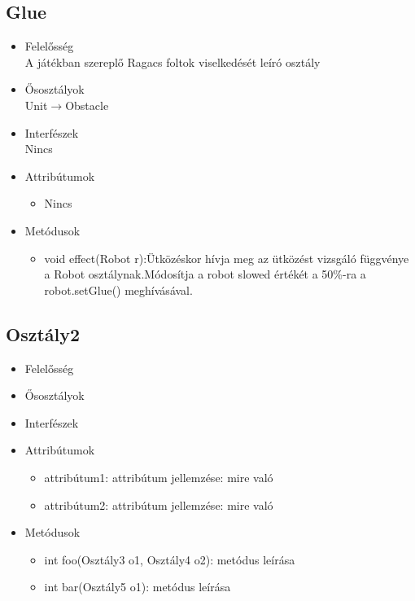 \subsection{Glue}
\begin{itemize}
\item Felelősség\\
A játékban szereplő Ragacs foltok viselkedését leíró osztály
\item Ősosztályok\\
Unit$\rightarrow$Obstacle
\item Interfészek\\
Nincs
\item Attribútumok\\
	\begin{itemize}
	   \item  Nincs
\end{itemize}
\item Metódusok\\
	\begin{itemize}
		\item void effect(Robot r):Ütközéskor hívja meg az ütközést vizsgáló függvénye a Robot osztálynak.Módosítja a robot slowed értékét a 50\%-ra a robot.setGlue() meghívásával.
	\end{itemize}
\end{itemize}

\subsection{Osztály2}
\begin{itemize}
\item Felelősség\\
\item Ősosztályok\\
\item Interfészek\\
\item Attribútumok\\
	\begin{itemize}
		\item attribútum1: attribútum jellemzése: mire való
		\item attribútum2: attribútum jellemzése: mire való
	\end{itemize}
\item Metódusok\\
	\begin{itemize}
		\item int foo(Osztály3 o1, Osztály4 o2): metódus leírása
		\item int bar(Osztály5 o1): metódus leírása
	\end{itemize}
\end{itemize}

